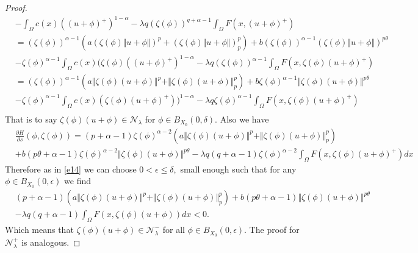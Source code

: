 \documentclass[10pt,twoside,reqno,centertags,draft]{amsart}
\begin{document}
\begin{proof}
\begin{equation*}
\begin{aligned}
& -\int_{\Omega}c(x)((u +\phi)^+)^{1 -\alpha} - \lambda q (\zeta(\phi))^{q +\alpha -1} \int_{\Omega} F(x,(u +\phi)^+)\\
&=(\zeta(\phi))^{\alpha -1} \left( a (\zeta(\phi)\Vert u +\phi\Vert)^{p} +(\zeta(\phi)\Vert u +\phi\Vert)^{p}_{p}\right) +b (\zeta(\phi))^{\alpha -1}(\zeta(\phi) \Vert u +\phi\Vert)^{p\theta} \\
& -\zeta(\phi)^{\alpha -1}\int_{\Omega} c(x) (\zeta(\phi)((u +\phi)^+)^{1 -\alpha} - \lambda q (\zeta(\phi))^{\alpha -1} \int_{\Omega} F(x,\zeta(\phi)(u +\phi)^+)\\
&=(\zeta(\phi))^{\alpha -1} \left( a\Vert \zeta(\phi)(u +\phi)\Vert^{p} +\Vert\zeta(\phi)(u +\phi)\Vert^{p}_{p}\right) +b \zeta(\phi)^{\alpha -1}\Vert \zeta(\phi)(u +\phi)\Vert^{p\theta} \\
& -\zeta(\phi)^{\alpha -1}\int_{\Omega} c(x)(\zeta(\phi)(u +\phi)^+))^{1 -\alpha} - \lambda q \zeta(\phi)^{\alpha -1} \int_{\Omega} F(x,\zeta(\phi)(u +\phi)^+)\\
\end{aligned}
\end{equation*}
That is to say $ \zeta(\phi)(u +\phi) \in \mathcal{N}_{\lambda}$ for $ \phi \in B_{X_0}(0, \delta).$ Also we have
\footnotesize
\begin{equation*}
\begin{aligned}
& \frac{\partial H}{\partial s}(\phi, \zeta(\phi))  = (p +\alpha -1)\zeta(\phi)^{\alpha -2} \left( a\Vert \zeta(\phi)(u +\phi)\Vert^{p} +\Vert \zeta(\phi)(u +\phi)\Vert^{p}_{p}\right)\\
& +b (p\theta +\alpha -1) \zeta(\phi)^{\alpha -2}\Vert \zeta(\phi)(u +\phi)\Vert^{p\theta} -\lambda q (q +\alpha -1) \zeta(\phi)^{\alpha -2} \int_{\Omega} F(x,\zeta(\phi)(u +\phi)^+)dx
\end{aligned}
\end{equation*} 
Therefore as in \ref{e14} we can choose $ 0 <\epsilon \leq \delta,$ small enough such that for any $ \phi \in B_{X_0}(0, \epsilon)$ we find
\footnotesize
\begin{equation*}
\begin{aligned}
&(p +\alpha -1)\left( a\Vert \zeta(\phi)(u +\phi)\Vert^{p} +\Vert \zeta(\phi)(u +\phi)\Vert^{p}_{p}\right) +b (p\theta +\alpha -1) \Vert \zeta(\phi)(u +\phi)\Vert^{p\theta}\\
&- \lambda q (q +\alpha -1) \int_{\Omega} F(x,\zeta(\phi)(u +\phi))dx < 0.
\end{aligned}
\end{equation*} 
Which means that $ \zeta(\phi)(u +\phi) \in \mathcal{N}_{\lambda}^{-}$ for all $ \phi \in B_{X_0}(0, \epsilon).$\newline
The proof for $ \mathcal{N}_{\lambda}^{+}$ is analogous.
\end{proof}
\end{document}
